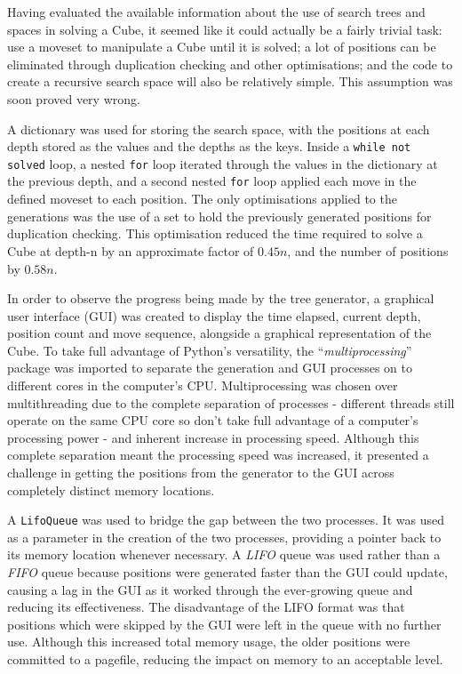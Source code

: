 \documentclass{report}
\newcommand{\tit}[1]{\textit{#1}}
\newcommand{\propernoun}[1]{\enquote{\tit{#1}}}
\newcommand{\depth}[1]{depth-#1}
\begin{document}
    Having evaluated the available information about the use of search trees and spaces in solving a Cube, it seemed like it could actually be a fairly trivial task: use a moveset to manipulate a Cube until it is solved; a lot of positions can be eliminated through duplication checking and other optimisations; and the code to create a recursive search space will also be relatively simple. This assumption was soon proved very wrong.
    
    A dictionary was used for storing the search space, with the positions at each depth stored as the values and the depths as the keys. Inside a \lstinline|while not solved| loop, a nested \lstinline|for| loop iterated through the values in the dictionary at the previous depth, and a second nested \lstinline|for| loop applied each move in the defined moveset to each position. The only optimisations applied to the generations was the use of a set to hold the previously generated positions for duplication checking. This optimisation reduced the time required to solve a Cube at \depth{n} by an approximate factor of $0.45n$, and the number of positions by $0.58n$.
    
    In order to observe the progress being made by the tree generator, a graphical user interface (GUI) was created to display the time elapsed, current depth, position count and move sequence, alongside a graphical representation of the Cube. To take full advantage of Python's versatility, the \propernoun{multiprocessing} package was imported to separate the generation and GUI processes on to different cores in the computer's CPU. Multiprocessing was chosen over multithreading due to the complete separation of processes - different threads still operate on the same CPU core so don't take full advantage of a computer's processing power - and inherent increase in processing speed. Although this complete separation meant the processing speed was increased, it presented a challenge in getting the positions from the generator to the GUI across completely distinct memory locations.
    
    A \lstinline|LifoQueue| was used to bridge the gap between the two processes. It was used as a parameter in the creation of the two processes, providing a pointer back to its memory location whenever necessary. A \tit{LIFO} queue was used rather than a \tit{FIFO} queue because positions were generated faster than the GUI could update, causing a lag in the GUI as it worked through the ever-growing queue and reducing its effectiveness. The disadvantage of the LIFO format was that positions which were skipped by the GUI were left in the queue with no further use. Although this increased total memory usage, the older positions were committed to a pagefile, reducing the impact on memory to an acceptable level.
    
\end{document}
